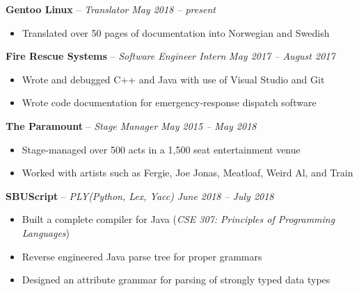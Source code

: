 \documentclass[11pt,letterpaper]{article}
\begin{document}
\spacedhrule{0.2em}{-0.8em} 




\headedsection
{\textbf{Gentoo Linux} -- \textit{Translator}}
{\textit{May 2018 -- present}} {
	\begin{itemize}[noitemsep,nolistsep]
		\item Translated over 50 pages of documentation into Norwegian and Swedish
	\end{itemize}
}


\headedsection 
{\textbf{Fire Rescue Systems} -- \textit{Software Engineer Intern}}
{\textit{May 2017 -- August 2017}} {
	\begin{itemize}[noitemsep,nolistsep]
		\item Wrote and debugged C++ and Java with use of Visual Studio and Git
		\item Wrote code documentation for emergency-response dispatch software
	\end{itemize}
}


\headedsection 
{\textbf{The Paramount} -- \textit{Stage Manager}}
{\textit{May 2015 -- May 2018}} {
	\begin{itemize}[noitemsep,nolistsep]
		\item Stage-managed over 500 acts in a 1,500 seat entertainment venue
		\item Worked with artists such as Fergie, Joe Jonas, Meatloaf, Weird Al, and Train
	\end{itemize}
}


\spacedhrule{0.2em}{-0.8em} 




\headedsection 
{\textbf{SBUScript} -- \textit{PLY(Python, Lex, Yacc)}}
{\textit{June 2018 -- July 2018}} {
	\begin{itemize}[noitemsep,nolistsep]
		\item Built a complete compiler for Java (\textit{CSE 307: Principles of Programming Languages})
		\item Reverse engineered Java parse tree for proper grammars
		\item Designed an attribute grammar for parsing of strongly typed data types
	\end{itemize}
}
					
\end{document}
